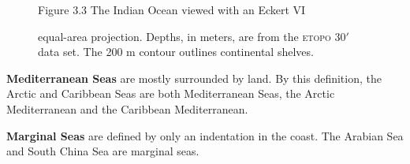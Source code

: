 \begin{figure}[t!]
\footnotesize
\centering
Figure 3.3 The Indian Ocean viewed with an Eckert VI\rule{0pt}{3ex}
equal-area projection. Depths, in meters, are from the \textsc{etopo}
30$'$ data set. The 200 m contour outlines continental shelves.

\label{fig:indian}
\vspace{-4ex}
\end{figure}

\textbf{Mediterranean Seas} are mostly
surrounded by land. By this definition, the Arctic and Caribbean Seas
are both Mediterranean Seas, the Arctic Mediterranean and the
Caribbean Mediterranean.

\textbf{Marginal Seas} are defined by only an
indentation in the coast. The Arabian Sea and South China Sea are
marginal seas.

